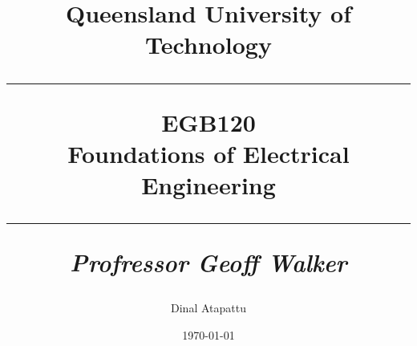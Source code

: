 \documentclass{book}
\begin{document}
    \title{
            Queensland University of Technology\\
            \rule{\linewidth}{0.5pt}
        \centering
        \textbf{EGB120} \\
        Foundations of Electrical Engineering\\
        \vspace{0.4cm}
        \rule{\linewidth}{1.5pt}
        \small{\textit{Profressor Geoff Walker}}
    }
    \author{Dinal Atapattu}
    \date{\today}
    \maketitle
    \thispagestyle{empty}
    \tableofcontents
\end{document}
